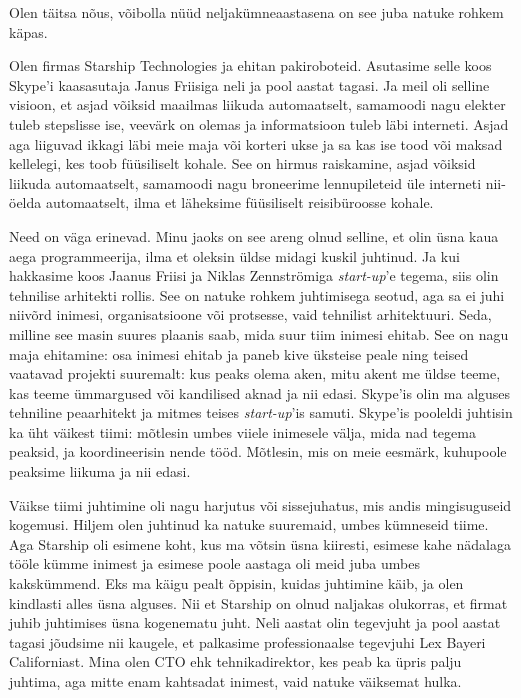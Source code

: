 Olen täitsa nõus, võibolla nüüd neljakümneaastasena on see juba 
natuke rohkem käpas. 


Olen firmas Starship Technologies ja ehitan 
pakiroboteid. Asutasime selle koos Skype'i kaasasutaja 
Janus Friisiga neli ja pool aastat 
tagasi. Ja meil oli selline 
visioon, et asjad võiksid maailmas liikuda automaatselt, samamoodi nagu 
elekter tuleb stepslisse ise, veevärk on olemas ja 
informatsioon tuleb läbi interneti. Asjad aga liiguvad ikkagi läbi meie maja 
või korteri ukse ja sa kas ise tood või maksad kellelegi, kes toob füüsiliselt 
kohale. See 
on hirmus raiskamine, asjad võiksid liikuda automaatselt, samamoodi nagu 
broneerime
lennupileteid üle interneti nii-öelda automaatselt, ilma et 
läheksime füüsiliselt reisibüroosse kohale.


Need on väga erinevad. Minu jaoks on see areng olnud selline, et 
olin üsna kaua aega programmeerija, ilma et oleksin 
üldse midagi kuskil juhtinud. Ja kui hakkasime koos Jaanus 
Friisi ja Niklas Zennströmiga \emph{start-up}'e tegema, 
siis olin 
tehnilise arhitekti rollis. See on
natuke rohkem juhtimisega seotud, aga sa ei juhi niivõrd inimesi, 
organisatsioone või protsesse, vaid tehnilist arhitektuuri. Seda,
milline see masin suures plaanis saab, mida suur 
tiim inimesi ehitab. See on nagu maja ehitamine: osa inimesi ehitab ja paneb 
kive üksteise peale ning teised vaatavad projekti 
suuremalt: kus peaks olema aken, mitu akent me üldse teeme, kas 
teeme ümmargused või kandilised aknad ja nii edasi. Skype'is olin ma alguses 
tehniline peaarhitekt ja 
mitmes teises \emph{start-up}'is samuti. Skype'is pooleldi juhtisin 
ka üht väikest tiimi: mõtlesin umbes viiele 
inimesele välja, mida nad tegema peaksid, ja koordineerisin nende tööd. 
Mõtlesin, mis on meie eesmärk, kuhupoole peaksime liikuma ja 
nii edasi. 

Väikse tiimi juhtimine oli nagu harjutus või sissejuhatus, mis andis 
mingisuguseid kogemusi. Hiljem olen juhtinud ka natuke suuremaid, umbes 
kümneseid tiime. Aga Starship oli esimene koht, kus 
ma võtsin üsna kiiresti, esimese kahe nädalaga tööle kümme inimest
ja esimese poole aastaga oli meid juba umbes kakskümmend. Eks ma käigu pealt 
õppisin, kuidas juhtimine käib, ja olen kindlasti alles
üsna alguses. Nii et Starship on olnud naljakas 
olukorras, et firmat juhib juhtimises üsna kogenematu juht. Neli aastat olin 
tegevjuht ja pool aastat tagasi jõudsime
nii kaugele, et palkasime professionaalse tegevjuhi Lex 
Bayeri Californiast. Mina olen CTO ehk 
tehnikadirektor, kes peab ka üpris palju juhtima, aga mitte enam kahtsadat 
inimest, vaid natuke väiksemat hulka.


